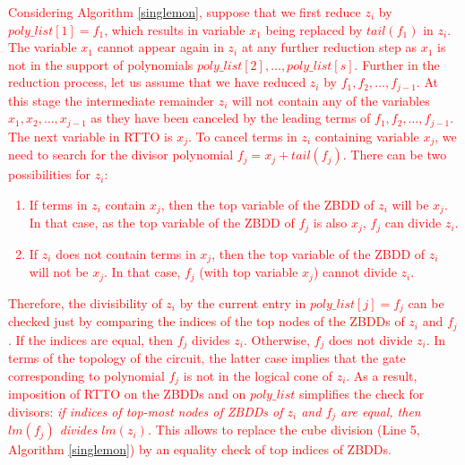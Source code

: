 \par \textcolor{red}{Considering Algorithm \ref{singlemon}, suppose
that we first reduce $z_i$ by $poly\_list[1]=f_1$, which results in
variable $x_1$ being replaced by $tail(f_1)$ in $z_i$. The
variable $x_1$ cannot appear  again in $z_i$ at any further reduction
step as $x_1$ is not in the support of  polynomials
$poly\_list[2],\dots,poly\_list[s]$. Further in the reduction process,
let us assume that we have reduced $z_i$ by 
$f_1,f_2,\dots,f_{j-1}$. At this stage the intermediate remainder
$z_i$ will not contain any of the variables $x_1,x_2,\dots,x_{j-1}$ as
they have been canceled by the leading terms of
$f_1,f_2,\dots,f_{j-1}$. The next variable in RTTO is $x_j$.
%
To cancel terms in $z_i$ containing variable $x_j$, we need to search
for the divisor polynomial $f_j = x_j + tail(f_j)$. 
%
There can be two possibilities for $z_i$: 
\begin{enumerate} 
\item If terms in $z_i$ contain
$x_j$, then the top variable of the ZBDD of $z_i$ will be $x_j$. In
  that case, as the top variable of the ZBDD of $f_j$ is also $x_j$,
  $f_j$ can divide $z_i$.
\item If $z_i$ does not contain terms in $x_j$, then the top variable
  of the ZBDD of $z_i$ will not be $x_j$. In that case, $f_j$ (with
  top variable $x_j$) cannot divide $z_i$. 
\end{enumerate}
Therefore, the divisibility of $z_i$ by  the current entry in
$poly\_list[j] = f_j$ can be checked just by comparing the indices of
the top nodes of the ZBDDs of $z_i$ and $f_j$. If the indices 
are equal, then $f_j$ divides $z_i$. Otherwise, $f_j$ does not divide
$z_i$. In terms of the topology of the circuit, the latter case
implies that the gate corresponding to polynomial $f_j$ is not in the
logical cone of $z_i$. 
%
As a result, imposition of RTTO on the ZBDDs and on $poly\_list$ simplifies the check
for divisors: {\it if indices of top-most nodes of ZBDDs of $z_i$ and
 $f_j$ are equal, then $lm(f_j)$ divides $lm(z_i)$.} 
This allows to 
replace the cube division (Line 5, Algorithm \ref{singlemon}) by an
equality check of top indices of ZBDDs.}

